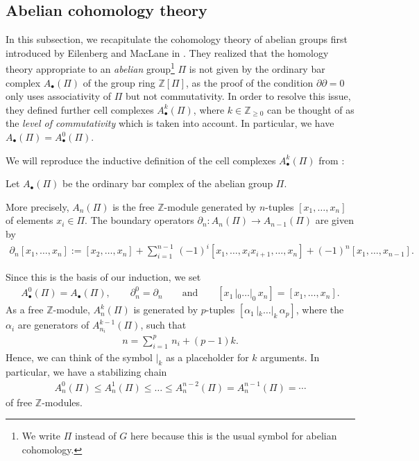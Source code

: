 \documentclass[pdftex]{sigma}
\numberwithin{equation}{section}
\newcommand{\ZZ }{\mathbb{Z}}
\begin{document}
\subsection{Abelian cohomology theory}

In this subsection, we recapitulate the cohomology theory of abelian groups first introduced by Eilenberg and MacLane in \cite{Eilenberg1950, Eilenberg1950a, MacLane1952}. They realized that the homology theory appropriate to an \textit{abelian} group\footnote{We write $\Pi$ instead of $G$ here because this is the usual symbol for abelian cohomology.} $\Pi$ is not given by the ordinary bar complex $A_\bullet(\Pi)$ of the group ring $\ZZ[\Pi]$, as the proof of the condition $\partial \partial=0$ only uses associativity of $\Pi$ but not commutativity. In order to resolve this issue, they defined further cell complexes $A^k_\bullet(\Pi)$, where $k \in \ZZ_{\geq 0}$ can be thought of as the \textit{level of commutativity} which is taken into account. In particular, we have $A_\bullet(\Pi)=A^0_\bullet(\Pi)$.

We will reproduce the inductive definition of the cell complexes $A^k_\bullet(\Pi)$ from \cite{Eilenberg1950a}:

Let $A_\bullet(\Pi)$ be the ordinary bar complex of the abelian group $\Pi$.

More precisely, $A_n(\Pi)$ is the free $\ZZ$-module generated by $n$-tuples $[x_1,\dots,x_n]$ of elements $x_i \in \Pi$. The boundary operators $\partial_n\colon A_n(\Pi) \to A_{n-1}(\Pi)$ are given by
\begin{align*}
 \partial_n [x_1,\dots,x_n] := [x_2, \dots,x_n] + \sum_{i=1}^{n-1}\,(-1)^i [x_1, \dots,x_{i}x_{i+1},\dots,x_n] + (-1)^n[x_1,\dots,x_{n-1}].
\end{align*}

Since this is the basis of our induction, we set
\begin{align*}
 A^0_\bullet(\Pi)=A_\bullet(\Pi), \qquad \partial^0_n = \partial_n \qquad \text{and} \qquad [x_1 \, |_0 \dots |_0 \, x_n]=[x_1, \dots , x_n].
\end{align*}
As a free $\ZZ$-module, $A^k_n(\Pi)$ is generated by $p$-tuples $[\alpha_1 \, |_k \dots |_k \, \alpha_p]$, where the $\alpha_i$ are generators of $A^{k-1}_{n_i}(\Pi)$, such that
\begin{align*}
 n= \sum_{i=1}^p \,n_i + (p-1)k.
\end{align*}
Hence, we can think of the symbol $|_k$ as a placeholder for $k$ arguments. In particular, we have a stabilizing chain
\begin{align}\label{eq: chain of cell complexes}
 A^0_n(\Pi) \leq A^1_n(\Pi) \leq \dots \leq A^{n-2}_n(\Pi) = A^{n-1}_n(\Pi) = \cdots
\end{align}
of free $\ZZ$-modules.
\end{document}
